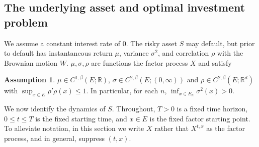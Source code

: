 \documentclass[11pt, letterpaper]{amsart}
\theoremstyle{definition}
\newtheorem{assumption}[theorem]{Assumption}
\theoremstyle{remark}
\numberwithin{equation}{section}
\newcommand{\reals}{\mathbb R}
\begin{document}
\subsection{The underlying asset and optimal investment problem}\label{SS:opt_invest}

We assume a constant interest rate of $0$. The risky asset $S$ may default, but prior to default has instantaneous return $\mu$, variance $\sigma^2$, and correlation $\rho$ with the Brownian motion $W$.  $\mu,\sigma,\rho$ are functions the factor process $X$ and satisfy
\begin{assumption}\label{A:asset_coeff}
$\mu\in C^{1,\beta}\left(E;\reals\right)$, $\sigma \in C^{2,\beta}\left(E; (0,\infty)\right)$ and $\rho\in C^{2,\beta}\left(E;\reals^d\right)$ with $\sup_{x\in E}\rho'\rho(x)\leq 1$. In particular, for each $n$, $\inf_{x\in E_n}\sigma^2(x) > 0$.
\end{assumption}

We now identify the dynamics of $S$.  Throughout, $T>0$ is a fixed time horizon, $0\leq t\leq T$ is the fixed starting time, and $x\in E$ is the fixed factor starting point.  To alleviate notation, in this section we write $X$ rather that $X^{t,x}$ as the factor process, and in general, suppress $(t,x)$.
\end{document}
